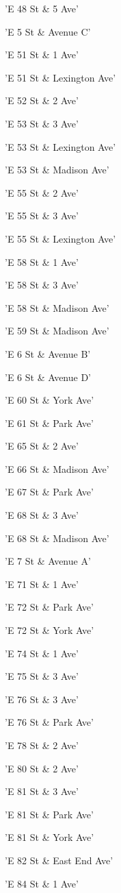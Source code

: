 \documentclass[11pt]{article}
\begin{document}
\begin{enumerate*}
\item 'E 48 St \& 5 Ave'
\item 'E 5 St \& Avenue C'
\item 'E 51 St \& 1 Ave'
\item 'E 51 St \& Lexington Ave'
\item 'E 52 St \& 2 Ave'
\item 'E 53 St \& 3 Ave'
\item 'E 53 St \& Lexington Ave'
\item 'E 53 St \& Madison Ave'
\item 'E 55 St \& 2 Ave'
\item 'E 55 St \& 3 Ave'
\item 'E 55 St \& Lexington Ave'
\item 'E 58 St \& 1 Ave'
\item 'E 58 St \& 3 Ave'
\item 'E 58 St \& Madison Ave'
\item 'E 59 St \& Madison Ave'
\item 'E 6 St \& Avenue B'
\item 'E 6 St \& Avenue D'
\item 'E 60 St \& York Ave'
\item 'E 61 St \& Park Ave'
\item 'E 65 St \& 2 Ave'
\item 'E 66 St \& Madison Ave'
\item 'E 67 St \& Park Ave'
\item 'E 68 St \& 3 Ave'
\item 'E 68 St \& Madison Ave'
\item 'E 7 St \& Avenue A'
\item 'E 71 St \& 1 Ave'
\item 'E 72 St \& Park Ave'
\item 'E 72 St \& York Ave'
\item 'E 74 St \& 1 Ave'
\item 'E 75 St \& 3 Ave'
\item 'E 76 St \& 3 Ave'
\item 'E 76 St \& Park Ave'
\item 'E 78 St \& 2 Ave'
\item 'E 80 St \& 2 Ave'
\item 'E 81 St \& 3 Ave'
\item 'E 81 St \& Park Ave'
\item 'E 81 St \& York Ave'
\item 'E 82 St \& East End Ave'
\item 'E 84 St \& 1 Ave'

\end{enumerate*}
\end{document}
